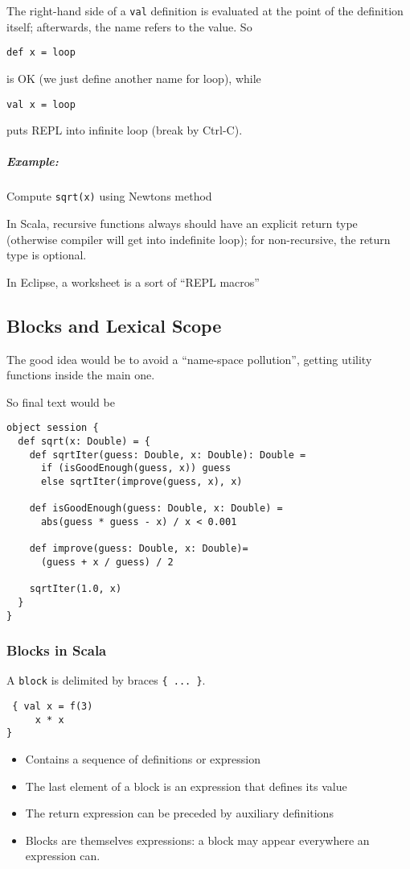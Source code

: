 \documentclass{scrartcl}
\newcommand{\example}{\subparagraph{Example:}} %
\newcommand{\term}[1]{\verb~#1~} %
\newcommand{\video}[1]{} %
\begin{document}
The right-hand side of a \lstinline|val| definition is evaluated at the point of
the definition itself; afterwards, the name refers to the value. So
\begin{lstlisting}
def x = loop
\end{lstlisting}
is OK (we just define another name for loop), while
\begin{lstlisting}
val x = loop
\end{lstlisting}
puts REPL into infinite loop (break by Ctrl-C). \video{2-5} \example Compute
\lstinline|sqrt(x)| using Newtons method

In Scala, recursive functions always should have an explicit return type
(otherwise compiler will get into indefinite loop); for non-recursive, the
return type is optional.

In Eclipse, a worksheet is a sort of ``REPL macros'' \video{2-6}

\subsection{Blocks and Lexical Scope}
\label{sec:BlocksAndScope}

The good idea would be to avoid a ``name-space pollution'', getting utility
functions inside the main one.

So final text would be
\begin{lstlisting}
object session {
  def sqrt(x: Double) = {
    def sqrtIter(guess: Double, x: Double): Double =
      if (isGoodEnough(guess, x)) guess
      else sqrtIter(improve(guess, x), x)

    def isGoodEnough(guess: Double, x: Double) =
      abs(guess * guess - x) / x < 0.001

    def improve(guess: Double, x: Double)=
      (guess + x / guess) / 2

    sqrtIter(1.0, x)
  }
}
\end{lstlisting}

\subsubsection{Blocks in Scala}
\label{sec:BlocksAndScope}

A \term{block} is delimited by braces \lstinline|{ ... }|.
\begin{lstlisting}
 { val x = f(3)
     x * x
}
\end{lstlisting}
\begin{itemize}
\item Contains a sequence of definitions or expression
\item The last element of a block is an expression that defines its value
\item The return expression can be preceded by auxiliary definitions
\item Blocks are themselves expressions: a block may appear everywhere an
  expression can.
\end{itemize}
\end{document}
